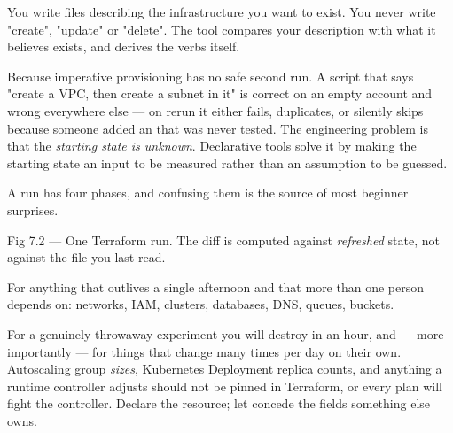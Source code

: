  You write files describing the infrastructure you want to exist. You never write "create", "update" or "delete". The tool compares your description with what it believes exists, and derives the verbs itself.

 Because imperative provisioning has no safe second run. A script that says "create a VPC, then create a subnet in it" is correct on an empty account and wrong everywhere else --- on rerun it either fails, duplicates, or silently skips because someone added an  that was never tested. The engineering problem is that the \emph{starting state is unknown}. Declarative tools solve it by making the starting state an input to be measured rather than an assumption to be guessed.

 A run has four phases, and confusing them is the source of most beginner surprises.

\begin{wbfigure}{Fig 7.2 — One Terraform run. The diff is computed against \emph{refreshed} state, not against the file you last read.}
\end{wbfigure}

 For anything that outlives a single afternoon and that more than one person depends on: networks, IAM, clusters, databases, DNS, queues, buckets.

 For a genuinely throwaway experiment you will destroy in an hour, and --- more importantly --- for things that change many times per day on their own. Autoscaling group \emph{sizes}, Kubernetes Deployment replica counts, and anything a runtime controller adjusts should not be pinned in Terraform, or every plan will fight the controller. Declare the resource; let  concede the fields something else owns.

